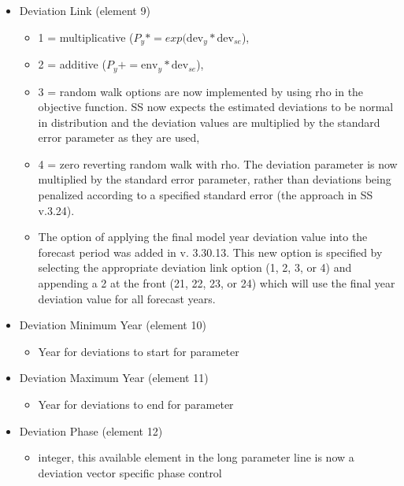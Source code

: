 \begin{itemize}
\item Deviation Link (element 9)
	\begin{itemize}
		\item 1 = multiplicative ($P_y*=exp(\text{dev}_y*\text{dev}_{se}$),
		\item 2 = additive ($P_y+=\text{env}_y*\text{dev}_{se}$),
		\item 3 = random walk options are now implemented by using rho in the objective function. SS now expects the estimated deviations to be normal in distribution and the deviation values are multiplied by the standard error parameter as they are used,
		\item 4 = zero reverting random walk with rho. The deviation parameter is now multiplied by the standard error parameter, rather than deviations being penalized according to a specified standard error (the approach in SS v.3.24).
		\item The option of applying the final model year deviation value into the forecast period was added in v. 3.30.13.  This new option is specified by selecting the appropriate deviation link option (1, 2, 3, or 4) and appending a 2 at the front (21, 22, 23, or 24) which will use the final year deviation value for all forecast years. 
	\end{itemize}
	
\item Deviation  Minimum Year (element 10)
	\begin{itemize}
		\item Year for deviations to start for parameter
	\end{itemize}
	
\item Deviation  Maximum Year (element 11)
	\begin{itemize}
		\item Year for deviations to end for parameter
	\end{itemize}
	
\item Deviation Phase (element 12)
	\begin{itemize}
		\item integer, this available element in the long parameter line is now a deviation vector specific phase control
	\end{itemize}
	

\end{itemize}
